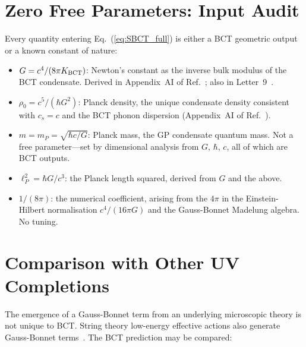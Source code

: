 \documentclass[twocolumn,10pt,a4paper]{article}
\begin{document}
\section*{Zero Free Parameters: Input Audit}

Every quantity entering Eq.~(\ref{eq:SBCT_full}) is either a BCT
geometric output or a known constant of nature:

\begin{itemize}
  \item $G = c^4/(8\pi K_{\rm BCT})$: Newton's constant as the inverse
    bulk modulus of the BCT condensate. Derived in Appendix~AI of
    Ref.~\cite{monograph}; also in Letter~9~\cite{planck}.
  \item $\rho_0 = c^5/(\hbar G^2)$: Planck density, the unique
    condensate density consistent with $c_s = c$ and the BCT phonon
    dispersion (Appendix~AI of Ref.~\cite{monograph}).
  \item $m = m_P = \sqrt{\hbar c/G}$: Planck mass, the GP condensate
    quantum mass. Not a free parameter---set by dimensional analysis
    from $G$, $\hbar$, $c$, all of which are BCT outputs.
  \item $\ell_P^2 = \hbar G/c^3$: the Planck length squared, derived
    from $G$ and the above.
  \item $1/(8\pi)$: the numerical coefficient, arising from the
    $4\pi$ in the Einstein-Hilbert normalisation
    $c^4/(16\pi G)$ and the Gauss-Bonnet Madelung algebra. No tuning.
\end{itemize}

\section*{Comparison with Other UV Completions}

The emergence of a Gauss-Bonnet term from an underlying microscopic
theory is not unique to BCT. String theory low-energy effective
actions also generate Gauss-Bonnet terms~\cite{gross86,metsaev87}.
The BCT prediction may be compared:
\end{document}
